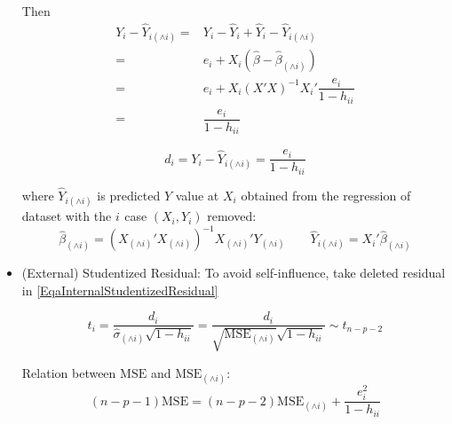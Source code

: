 \begin{itemize}[topsep=2pt,itemsep=2pt]
{        Then 
            \begin{align*}
            Y_i-\hat{Y}_{i(\wedge i)}=&Y_i-\hat{Y}_i+\hat{Y}_i-\hat{Y}_{i(\wedge i)}\\
            =&e_i+X_i(\hat{\beta }-\hat{\beta }_{(\wedge i)})\\
            =&e_i+X_i(X'X)^{-1}X_i'\dfrac{e_i}{1-h_{ii}}\\
            =&\dfrac{e_i}{1-h_{ii}} 
        \end{align*}

    }


    \begin{equation}\label{EqaEstimatorWithWedgeX}
        d_i=Y_i-\hat{Y}_{i(\wedge i)} =\dfrac{e_i}{1-h_{ii}}
    \end{equation}

    where $ \hat{Y}_{i(\wedge i)} $ is predicted $ Y $ value at $ X_i $ obtained from the regression of dataset with the $ i^\mathrm{} $ case $ (X_i,Y_i) $ removed:
    \begin{equation}
         \hat{\beta} _{(\wedge i)}=(X_{(\wedge i)}'X_{(\wedge i)})^{-1}X_{(\wedge i)}'Y_{(\wedge i)}\qquad \hat{Y}_{i(\wedge i)}=X_i'\hat{\beta} _{(\wedge i)}
    \end{equation}
        
    \item (External) Studentized Residual: To avoid self-influence, take deleted residual in \autoref{EqaInternalStudentizedResidual}
    
    \begin{equation}
         t_i=\dfrac{d_i}{\hat{\sigma} _{(\wedge i)}\sqrt{1-h_{ii}}}= \dfrac{d_i}{\sqrt{\mathrm{MSE}_{(\wedge i)} }\sqrt{1-h_{ii}}}\sim t_{n-p-2}
    \end{equation}

    Relation between $ \mathrm{MSE}  $ and $ \mathrm{MSE}_{(\wedge i)}  $:
    \begin{equation}
        (n-p-1)\mathrm{MSE}=(n-p-2)\mathrm{MSE}_{(\wedge i)}+\dfrac{e_i^2}{1-h_{ii}}   
    \end{equation}
    
    
    
\end{itemize}


